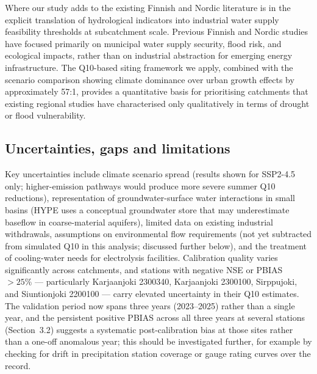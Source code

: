 \documentclass[draft]{agujournal2019}
\begin{document}
Where our study adds to the existing Finnish and Nordic literature is in the explicit translation of hydrological indicators into industrial water supply feasibility thresholds at subcatchment scale. Previous Finnish and Nordic studies have focused primarily on municipal water supply security, flood risk, and ecological impacts, rather than on industrial abstraction for emerging energy infrastructure. The Q10-based siting framework we apply, combined with the scenario comparison showing climate dominance over urban growth effects by approximately 57:1, provides a quantitative basis for prioritising catchments that existing regional studies have characterised only qualitatively in terms of drought or flood vulnerability.

\subsection{Uncertainties, gaps and limitations}
Key uncertainties include climate scenario spread (results shown for SSP2-4.5 only; higher-emission pathways would produce more severe summer Q10 reductions), representation of groundwater-surface water interactions in small basins (HYPE uses a conceptual groundwater store that may underestimate baseflow in coarse-material aquifers), limited data on existing industrial withdrawals, assumptions on environmental flow requirements (not yet subtracted from simulated Q10 in this analysis; discussed further below), and the treatment of cooling-water needs for electrolysis facilities. Calibration quality varies significantly across catchments, and stations with negative NSE or PBIAS $> 25\%$ — particularly Karjaanjoki 2300340, Karjaanjoki 2300100, Sirppujoki, and Siuntionjoki 2200100 — carry elevated uncertainty in their Q10 estimates. The validation period now spans three years (2023--2025) rather than a single year, and the persistent positive PBIAS across all three years at several stations (Section~3.2) suggests a systematic post-calibration bias at those sites rather than a one-off anomalous year; this should be investigated further, for example by checking for drift in precipitation station coverage or gauge rating curves over the record.
\end{document}
